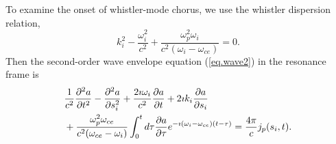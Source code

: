 To examine the onset of  whistler-mode chorus, we use the whistler dispersion relation,
\begin{equation}
k_i^2 - \frac{\omega_i^2}{c^2}+\frac{\omega_p^2 \omega_i}{c^2\left(\omega_i-\omega_{c e}\right)}=0.
\end{equation}
Then the second-order wave envelope  equation  (\ref{eq.wave2}) in the resonance frame is  
\begin{equation}\label{eq.wave_2nd}
    \begin{aligned}
   & \frac{1}{c^2}\frac{\partial^2 a}{\partial t^2} - \frac{\partial^2 a}{\partial s_i^2} + \frac{2\imath\omega_i}{c^2}\frac{\partial a}{\partial t} + 2\imath k_i\frac{\partial a}{\partial s_i} \\
   &+ \frac{\omega_p^2 \omega_{c e}}{c^2(\omega_{c e}-\omega_i)} \int_0^t d \tau \frac{\partial a}{\partial \tau} e^{-\imath\left(\omega_i-\omega_{c e}\right)(t-\tau)} = 
    {4 \pi \over c}    j_p(s_i,t) .
    \end{aligned}
\end{equation}





